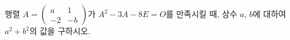 행렬 $A=\begin{pmatrix} a & 1 \\ -2 & -b \end{pmatrix}$가 $A^2-3A-8E=O$를 만족시킬 때, 상수 $a$, $b$에 대하여 $a^2+b^2$의 값을 구하시오.
